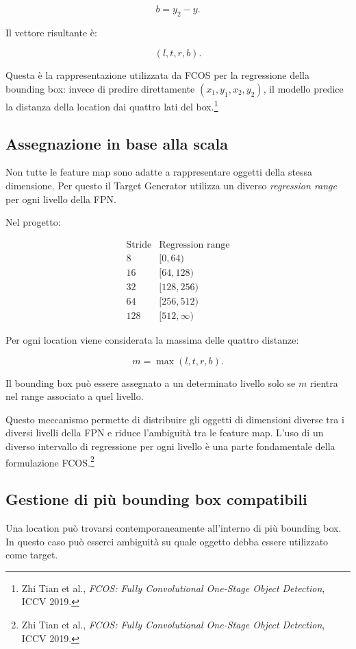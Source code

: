 \[
b=y_2-y.
\]

Il vettore risultante è:

\[
(l,t,r,b).
\]

Questa è la rappresentazione utilizzata da FCOS per la regressione della
bounding box: invece di predire direttamente $(x_1,y_1,x_2,y_2)$, il modello
predice la distanza della location dai quattro lati del box.\footnote{Zhi Tian
et al., \textit{FCOS: Fully Convolutional One-Stage Object Detection},
ICCV 2019.}

\subsection{Assegnazione in base alla scala}

Non tutte le feature map sono adatte a rappresentare oggetti della stessa
dimensione. Per questo il Target Generator utilizza un diverso
\textit{regression range} per ogni livello della FPN.

Nel progetto:

\[
\begin{array}{c|c}
\text{Stride} & \text{Regression range} \\
\hline
8   & [0,64) \\
16  & [64,128) \\
32  & [128,256) \\
64  & [256,512) \\
128 & [512,\infty)
\end{array}
\]

Per ogni location viene considerata la massima delle quattro distanze:

\[
m=\max(l,t,r,b).
\]

Il bounding box può essere assegnato a un determinato livello solo se $m$
rientra nel range associato a quel livello.

Questo meccanismo permette di distribuire gli oggetti di dimensioni diverse
tra i diversi livelli della FPN e riduce l'ambiguità tra le feature map.
L'uso di un diverso intervallo di regressione per ogni livello è una parte
fondamentale della formulazione FCOS.\footnote{Zhi Tian et al.,
\textit{FCOS: Fully Convolutional One-Stage Object Detection}, ICCV 2019.}

\subsection{Gestione di più bounding box compatibili}

Una location può trovarsi contemporaneamente all'interno di più bounding box.
In questo caso può esserci ambiguità su quale oggetto debba essere utilizzato
come target.

